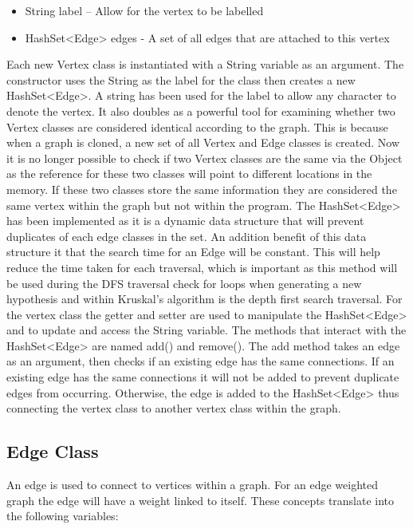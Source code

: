 \documentclass{AISB2008}
\begin{document}
\begin{itemize}
\item String label – Allow for the vertex to be labelled
\item HashSet<Edge> edges - A set of all edges that are attached to this vertex
\end{itemize}
Each new Vertex class is instantiated with a String variable as an argument. The constructor uses the String as the label for the class then creates a new HashSet<Edge>. A string has been used for the label to allow any character to denote the vertex. It also doubles as a powerful tool for examining whether two Vertex classes are considered identical according to the graph. This is because when a graph is cloned, a new set of all Vertex and Edge classes is created. Now it is no longer possible to check if two Vertex classes are the same via the Object as the reference for these two classes will point to different locations in the memory. If these two classes store the same information they are considered the same vertex within the graph but not within the program.
The HashSet<Edge> has been implemented as it is a dynamic data structure that will prevent duplicates of each edge classes in the set. An addition benefit of this data structure it that the search time for an Edge will be constant. This will help reduce the time taken for each traversal, which is important as this method will be used during the DFS traversal check for loops when generating a new hypothesis and within Kruskal’s algorithm is the depth first search traversal.
For the vertex class the getter and setter are used to manipulate the HashSet<Edge> and to update and access the String variable. The methods that interact with the HashSet<Edge> are named add() and remove(). The add method takes an edge as an argument, then checks if an existing edge has the same connections. If an existing edge has the same connections it will not be added to prevent duplicate edges from occurring. Otherwise, the edge is added to the HashSet<Edge> thus connecting the vertex class to another vertex class within the graph.


\subsection{Edge Class}

An edge is used to connect to vertices within a graph. For an edge weighted graph the edge will have a weight linked to itself. These concepts translate into the following variables:
\end{document}

